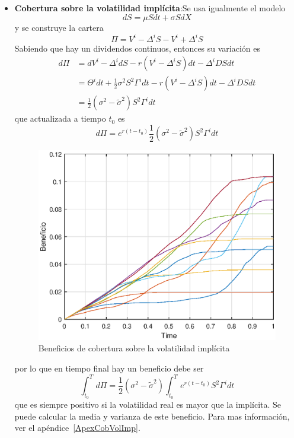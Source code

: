 \begin{itemize}
    \item \textbf{Cobertura sobre la volatilidad implícita}:Se usa igualmente el modelo
    \[
        dS = \mu S dt + \sigma S dX
    \]
    y se construye la cartera
    \[
        \Pi = V^i-\Delta^i S-V^i + \Delta^i S
    \]
    Sabiendo que hay un dividendos continuos, entonces su variación es
    \begin{align*}
        d\Pi &= dV^i - \Delta^i dS - r(V^i - \Delta^i S)dt - \Delta^i D S dt \\
        &= \Theta^i dt + \frac{1}{2} \sigma^2 S^2 \Gamma^i dt - r(V^i - \Delta^i S)dt - \Delta^i D S dt \\
        &= \frac{1}{2}(\sigma^2 - \tilde{\sigma}^2)S^2 \Gamma^i dt
    \end{align*}
    que actualizada a tiempo $t_0$ es
    \[ 
        d\Pi = e^{r(t-t_0)}\frac{1}{2}(\sigma^2 - \tilde{\sigma}^2)S^2 \Gamma^i dt
    \]
    \begin{figure}[H]
        \centering
        \includegraphics[width=0.65\linewidth]{Imagenes/Parte1/10_Cobertura/Cobertura_Volat_Imp.eps}
        \caption{Beneficios de cobertura sobre la volatilidad implícita}
    \end{figure}
    por lo que en tiempo final hay un beneficio debe ser
    \[
        \boxed{\int_{t_0}^T d\Pi = \frac{1}{2}(\sigma^2 - \tilde{\sigma}^2) \int_{t_0}^T e^{r(t-t_0)}S^2 \Gamma^i dt}
    \]
    que es siempre positivo si la volatilidad real es mayor que la implícita. Se puede calcular la media y varianza de este beneficio. Para mas información, ver el apéndice~\ref{ApexCobVolImp}.


\end{itemize}
